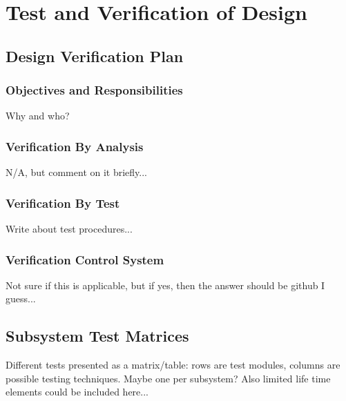 \chapter{Test and Verification of Design}
\label{chap:test_verification}

\section{Design Verification Plan}

\subsection{Objectives and Responsibilities}

Why and who?

\subsection{Verification By Analysis}

N/A, but comment on it briefly...

\subsection{Verification By Test}

Write about test procedures...

\subsection{Verification Control System}

Not sure if this is applicable, but if yes, then the answer should be github I guess...

\section{Subsystem Test Matrices}

Different tests presented as a matrix/table: rows are test modules, columns are possible testing techniques. Maybe one per subsystem? Also limited life time elements could be included here...
